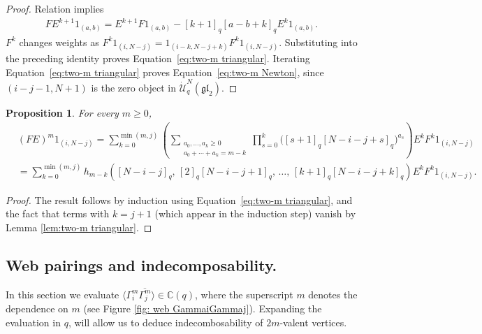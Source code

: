 \documentclass[12pt]{amsart}
\newtheorem{proposition}[theorem]{Proposition}
\theoremstyle{definition}
\theoremstyle{remark}
\numberwithin{equation}{section}
\numberwithin{figure}{section}
\newcommand{\GL}{\mathfrak{gl}}
\newcommand{\C}{\mathbb{C}}
\begin{document}
\begin{proof}
Relation \cite[Equation (4.1)]{CKM2014} implies
\begin{align*}
    FE^{k+1}1_{(a,b)}
    =E^{k+1}F1_{(a,b)}-[k+1]_q[a-b+k]_q E^k1_{(a,b)}.
\end{align*}
$F^k$ changes weights as $F^k 1_{(i,N-j)} = 1_{(i-k,N-j+k)} F^k 1_{(i,N-j)}$. Substituting into the preceding identity proves Equation~\eqref{eq:two-m triangular}. Iterating Equation~\eqref{eq:two-m triangular} proves Equation~\eqref{eq:two-m Newton}, since $(i-j-1,N+1)$ is the zero object in $\dot{\mathcal U}_q^{N}(\GL_2)$. 
\end{proof}

\begin{proposition}\label{prop:two-m powers}
For every $m\geq 0$,
\begin{align*}
    &(FE)^m1_{(i,N-j)}
    =\sum_{k=0}^{\min(m,j)}
    \left(
    \sum_{\substack{a_0,\ldots,a_k\geq 0\\a_0+\cdots+a_k=m-k}}
    \prod_{s=0}^k\bigl([s+1]_q[N-i-j+s]_q\bigr)^{a_s}
    \right)E^kF^k1_{(i,N-j)}  \\
    &=\sum_{k=0}^{\min(m,j)}
h_{m-k}\left(
    [N-i-j]_q,\,
    [2]_q[N-i-j+1]_q,\,
    \ldots,\,
    [k+1]_q[N-i-j+k]_q
\right)E^kF^k1_{(i,N-j)}.
\end{align*} 
\end{proposition}

\begin{proof}
The result follows by induction using Equation~\eqref{eq:two-m triangular}, and the fact that terms with $k=j+1$ (which appear in the induction step) vanish by Lemma \ref{lem:two-m triangular}.
\end{proof}

\subsection{Web pairings and indecomposability.}

In this section we evaluate $\langle \Gamma_i^m\overline{\Gamma_j^m} \rangle \in \C(q)$, where the superscript $m$ denotes the dependence on $m$ (see Figure \ref{fig: web GammaiGammaj}). Expanding the evaluation in $q$, will allow us to deduce indecombosability of $2m$-valent vertices.
\end{document}
